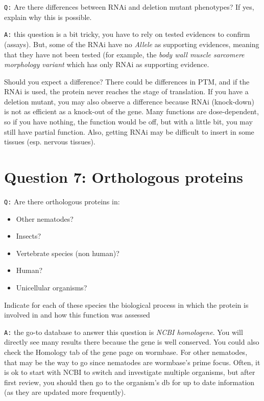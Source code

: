\documentclass[11pt, a4paper,titlepage]{article}
\begin{document}
\texttt{Q:} Are there differences between RNAi and deletion mutant
phenotypes? If yes, explain why this is possible.
\smallskip

\noindent\texttt{A:} this question is a bit tricky, you have to rely
on tested evidences to confirm (assays). But, some of the RNAi have no
\emph{Allele} as supporting evidences, meaning that they have not been
tested (for example, the \emph{body wall muscle sarcomere morphology
  variant} which has only RNAi as supporting evidence.

Should you expect a difference? There could be differences in PTM, and
if the RNAi is used, the protein never reaches the stage of
translation. If you have a deletion mutant, you may also observe a
difference because RNAi (knock-down) is not as efficient as a
knock-out of the gene. Many functions are dose-dependent, so if you
have nothing, the function would be off, but with a little bit, you
may still have partial function. Also, getting RNAi may be difficult
to insert in some tissues (esp. nervous tissues).

\section*{Question 7: Orthologous proteins}

\texttt{Q:} Are there orthologous proteins in:
\begin{itemize}
\itemsep0em 
\item Other nematodes?
\item Insects?
\item Vertebrate species (non human)?
\item Human?
\item Unicellular organisms?
\end{itemize}
Indicate for each of these species the biological process in which the
protein is involved in and how this function was assessed
\smallskip

\noindent\texttt{A:} the go-to database to answer this question is
\emph{NCBI homologene}. You will directly see many results there
because the gene is well conserved. You could also check the Homology
tab of the gene page on wormbase. For other nematodes, that may be the
way to go since nematodes are wormbase's prime focus. Often, it is ok
to start with NCBI to switch and investigate multiple organisms, but
after first review, you should then go to the organism's db for up to
date information (as they are updated more frequently).
\end{document}
